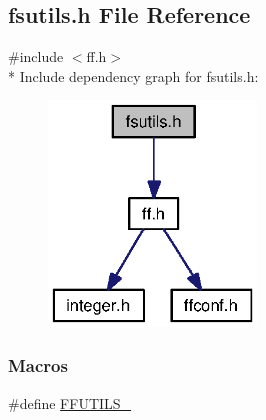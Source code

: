 \subsection{fsutils.\+h File Reference}
\label{fsutils_8h}
{\ttfamily \#include $<$ff.\+h$>$}\\*
Include dependency graph for fsutils.\+h\+:
\nopagebreak
\begin{figure}[H]
\begin{center}
\leavevmode
\includegraphics[width=157pt]{fsutils_8h__incl}
\end{center}
\end{figure}
\subsubsection*{Macros}
\begin{DoxyCompactItemize}
\item 
\#define \hyperlink{fsutils_8h_ae0f9f379fdea300d0168f89f33f241a6}{F\+F\+U\+T\+I\+L\+S\+\_\+}
\end{DoxyCompactItemize}
